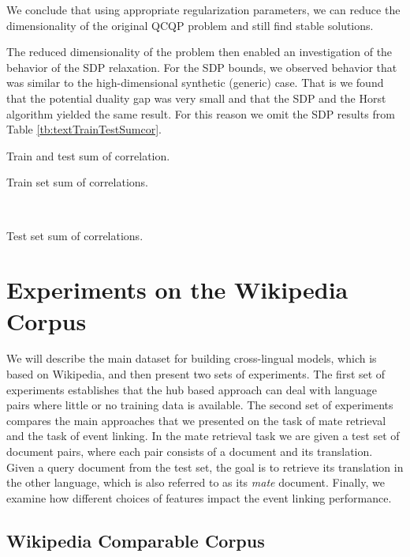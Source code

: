 We conclude that using appropriate regularization parameters,
we can reduce the dimensionality of the
original QCQP problem and still find stable
solutions.

The reduced dimensionality of the problem then enabled an investigation of
the behavior of the SDP relaxation. For the SDP bounds, we observed behavior that was
similar to the high-dimensional synthetic (generic) case. That is
we found that the potential duality gap was very small and that the SDP and the Horst algorithm yielded the same
result. For this reason we omit the SDP results from Table \ref{tb:textTrainTestSumcor}.

\begin{table}[t]
  \caption{Train and test sum of correlation.}
    \begin{subtable}[t]{\textwidth}
        \centering
        \caption{Train set sum of correlations.}
        
        \label{tb:trainText}
    \end{subtable}
    ~
    \begin{subtable}[t]{\textwidth}
        \centering
        \caption{Test set sum of correlations.}
        
        \label{tb:testText}
    \end{subtable}
  \label{tb:textTrainTestSumcor}
\end{table}

\section{Experiments on the Wikipedia Corpus}\label{sec:evaluation}

We will describe the main dataset for building cross-lingual models, which is
based on Wikipedia, and then present two sets of experiments. The first set of experiments
establishes that the hub based approach can deal with language pairs where little
or no training data is available. The second set of experiments compares the main approaches
that we presented on the task of mate retrieval and the task of event linking. In the mate retrieval task we are given a test set of document pairs, where each pair consists of a document and its translation. Given a query document from the test set, the goal is to retrieve its translation in the other language, which is also referred to as its \emph{mate} document. Finally, we examine how different choices of features impact the event linking performance.

\subsection{Wikipedia Comparable Corpus}

